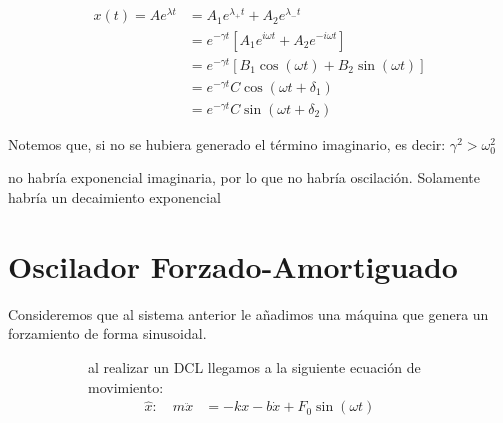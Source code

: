 \documentclass[letterpaper,11pt]{article}
\begin{document}
\begin{multicols}{2}
    \begin{center}
        \begin{tcolorbox}[colback=white,colframe=red, width=0.5\textwidth]
            \begin{align*}
                x(t) = Ae^{\lambda t} &= A_1e^{\lambda_+t}+A_2e^{\lambda_-t}\\
                &= e^{-\gamma t}\left[A_1e^{i\omega t}+A_2e^{-i\omega t}\right]\\
                &= e^{-\gamma t} \left[B_1\cos{(\omega t)}+B_2\sin{(\omega t)}\right]\\
                &= e^{-\gamma t} C\cos{(\omega t+\delta_1)}\\
                &= e^{-\gamma t} C\sin{(\omega t+\delta_2)}
            \end{align*}
        \end{tcolorbox}
    \end{center}
    \columnbreak
    \begin{figure}[H]
        \centering
        
    \end{figure}
\end{multicols}

\noindent Notemos que, si no se hubiera generado el término imaginario, es decir: $\gamma^2>\omega_0^2$

\noindent no habría exponencial imaginaria, por lo que no habría oscilación. Solamente habría un decaimiento exponencial

\section*{Oscilador Forzado-Amortiguado}
\noindent Consideremos que al sistema anterior le añadimos una máquina que genera un forzamiento de forma sinusoidal.

\begin{figure}[H]
    \centering
    \begin{subfigure}[tr]{0.35\textwidth}
        \centering
        
    \end{subfigure}
    \begin{subfigure}[tl]{0.6\textwidth}
        al realizar un DCL llegamos a la siguiente ecuación de movimiento:
        \begin{align*}
            \hat{x}: \quad m\ddot{x}&=-kx-b\dot{x}+F_0\sin{(\omega t)}
        \end{align*}
        \vfill{}
    \end{subfigure}
\end{figure}
\end{document}
